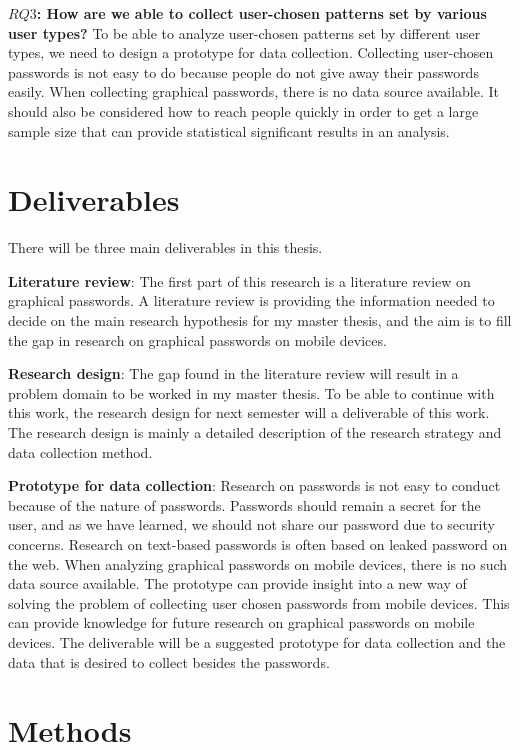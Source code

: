   {\bf $RQ3$: How are we able to collect user-chosen patterns set by various user types?}
  To be able to analyze user-chosen patterns set by different user types, we need to design a prototype for data collection. Collecting user-chosen passwords is not easy to do because people do not give away their passwords easily. When collecting graphical passwords, there is no data source available. It should also be considered how to reach people quickly in order to get a large sample size that can provide statistical significant results in an analysis.

  \section{Deliverables} \label{sec:deliverables}

  There will be three main deliverables in this thesis.

  {\bf Literature review}: The first part of this research is a literature review on graphical passwords. A literature review is providing the information needed to decide on the main research hypothesis for my master thesis, and the aim is to fill the gap in research on graphical passwords on mobile devices.

  {\bf Research design}: The gap found in the literature review will result in a problem domain to be worked in my master thesis. To be able to continue with this work, the research design for next semester will a deliverable of this work. The research design is mainly a detailed description of the research strategy and data collection method.

  {\bf Prototype for data collection}: Research on passwords is not easy to conduct because of the nature of passwords. Passwords should remain a secret for the user, and as we have learned, we should not share our password due to security concerns. Research on text-based passwords is often based on leaked password on the web. When analyzing graphical passwords on mobile devices, there is no such data source available. The prototype can provide insight into a new way of solving the problem of collecting user chosen passwords from mobile devices. This can provide knowledge for future research on graphical passwords on mobile devices. The deliverable will be a suggested prototype for data collection and the data that is desired to collect besides the passwords.

  \section{Methods} \label{sec:methods}


